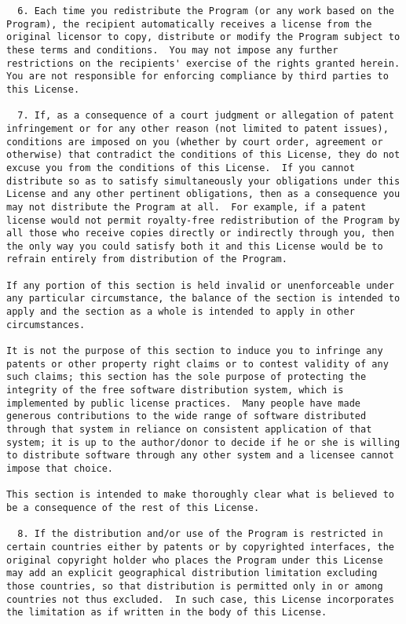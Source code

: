 \begin{verbatim}
  6. Each time you redistribute the Program (or any work based on the
Program), the recipient automatically receives a license from the
original licensor to copy, distribute or modify the Program subject to
these terms and conditions.  You may not impose any further
restrictions on the recipients' exercise of the rights granted herein.
You are not responsible for enforcing compliance by third parties to
this License.

  7. If, as a consequence of a court judgment or allegation of patent
infringement or for any other reason (not limited to patent issues),
conditions are imposed on you (whether by court order, agreement or
otherwise) that contradict the conditions of this License, they do not
excuse you from the conditions of this License.  If you cannot
distribute so as to satisfy simultaneously your obligations under this
License and any other pertinent obligations, then as a consequence you
may not distribute the Program at all.  For example, if a patent
license would not permit royalty-free redistribution of the Program by
all those who receive copies directly or indirectly through you, then
the only way you could satisfy both it and this License would be to
refrain entirely from distribution of the Program.

If any portion of this section is held invalid or unenforceable under
any particular circumstance, the balance of the section is intended to
apply and the section as a whole is intended to apply in other
circumstances.

It is not the purpose of this section to induce you to infringe any
patents or other property right claims or to contest validity of any
such claims; this section has the sole purpose of protecting the
integrity of the free software distribution system, which is
implemented by public license practices.  Many people have made
generous contributions to the wide range of software distributed
through that system in reliance on consistent application of that
system; it is up to the author/donor to decide if he or she is willing
to distribute software through any other system and a licensee cannot
impose that choice.

This section is intended to make thoroughly clear what is believed to
be a consequence of the rest of this License.

  8. If the distribution and/or use of the Program is restricted in
certain countries either by patents or by copyrighted interfaces, the
original copyright holder who places the Program under this License
may add an explicit geographical distribution limitation excluding
those countries, so that distribution is permitted only in or among
countries not thus excluded.  In such case, this License incorporates
the limitation as if written in the body of this License.


\end{verbatim}
